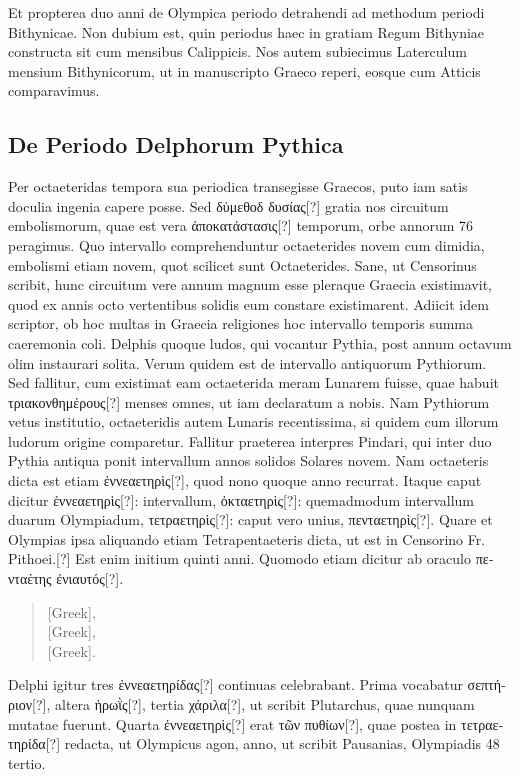 Et propterea duo anni de Olympica periodo detrahendi ad
methodum periodi Bithynicae.
Non dubium est, quin periodus haec
in gratiam Regum Bithyniae constructa sit cum mensibus Calippicis.
Nos autem subiecimus Laterculum mensium Bithynicorum, ut in
manuscripto Graeco reperi, eosque cum Atticis comparavimus.

\subsection{De Periodo Delphorum Pythica}

Per octaeteridas tempora sua periodica transegisse Graecos, puto
iam satis doculia ingenia capere posse.
Sed \textgreek{δὐμεθοδ δυσίας[?]} gratia
nos circuitum embolismorum, quae est vera \textgreek{ἀποκατάστασις[?]} temporum,
orbe annorum 76 peragimus.
Quo intervallo comprehenduntur
octaeterides novem cum dimidia, embolismi etiam novem, quot scilicet
sunt Octaeterides.
Sane, ut Censorinus scribit, hunc circuitum
vere annum magnum esse pleraque Graecia existimavit, quod ex annis
octo vertentibus solidis eum constare existimarent.
Adiicit idem
scriptor, ob hoc multas in Graecia religiones hoc intervallo temporis
summa caeremonia coli.
Delphis quoque ludos, qui vocantur Pythia,
post annum octavum olim instaurari solita.
Verum quidem est de intervallo
antiquorum Pythiorum.
Sed fallitur, cum existimat eam octaeterida
meram Lunarem fuisse, quae habuit \textgreek{τριακονθημέρους[?]} menses omnes,
ut iam declaratum a nobis.
Nam Pythiorum vetus institutio,
octaeteridis autem Lunaris recentissima, si quidem cum illorum ludorum
origine comparetur.
Fallitur praeterea interpres Pindari, qui
inter duo Pythia antiqua ponit intervallum annos solidos Solares
novem.
Nam octaeteris dicta est etiam \textgreek{ἐννεαετηρὶς[?]},
 quod nono quoque
anno recurrat.
Itaque caput dicitur \textgreek{ἐννεαετηρὶς[?]}: intervallum,
\textgreek{ὀκταετηρὶς[?]}: quemadmodum intervallum duarum Olympiadum,
 \textgreek{τετραετηρὶς[?]}:
caput vero unius, \textgreek{πενταετηρὶς[?]}.
Quare et Olympias ipsa
aliquando etiam Tetrapentaeteris dicta, ut est in Censorino Fr. Pithoei.[?]
Est enim initium quinti anni.
Quomodo etiam dicitur ab oraculo \textgreek{πενταέτης ἐνιαυτός[?]}.
\begin{quote}
\textgreek{[Greek]},\\
\textgreek{[Greek]},\\
\textgreek{[Greek]}.
\end{quote}
Delphi igitur tres \textgreek{ἐννεαετηρίδας[?]} continuas celebrabant.
Prima vocabatur
\textgreek{σεπτήριον[?]}, altera \textgreek{ἡρωῒς[?]},
 tertia \textgreek{χάριλα[?]}, ut scribit Plutarchus, quae
nunquam mutatae fuerunt.
Quarta \textgreek{ἐννεαετηρὶς[?]} erat \textgreek{τῶν πυθίων[?]}, quae
postea in \textgreek{τετραετηρίδα[?]} redacta,
 ut Olympicus agon, anno, ut scribit
Pausanias, Olympiadis 48 tertio.

